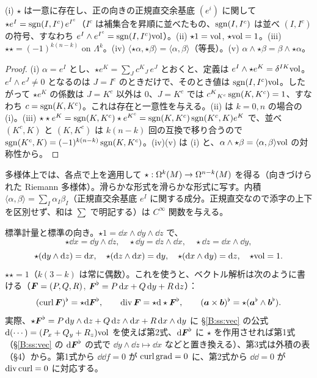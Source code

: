 \begin{prop}\label{B:prop:star}\tP
(i) $\star$ は一意に存在し、正の向きの正規直交余基底 $(e^i)$ に関して $\star e^I=\operatorname{sgn}(I,I^c)\,e^{I^c}$（$I^c$ は補集合を昇順に並べたもの、$\operatorname{sgn}(I,I^c)$ は並べ $(I,I^c)$ の符号、すなわち $e^I\wedge e^{I^c}=\operatorname{sgn}(I,I^c)\mathrm{vol}$）。(ii) $\star1=\mathrm{vol}$, $\star\mathrm{vol}=1$。(iii) $\star\star=(-1)^{k(n-k)}$ on $\Lambda^k$。(iv) $\langle\star\alpha,\star\beta\rangle=\langle\alpha,\beta\rangle$（等長）。(v) $\alpha\wedge\star\beta=\beta\wedge\star\alpha$。
\end{prop}
\begin{proof}
(i) $\alpha=e^I$ とし、$\star e^K=\sum_Jc^K{}_J\,e^J$ とおくと、定義は $e^I\wedge\star e^K=\delta^{IK}\mathrm{vol}$。$e^I\wedge e^J\ne0$ となるのは $J=I^c$ のときだけで、そのとき値は $\operatorname{sgn}(I,I^c)\mathrm{vol}$。したがって $\star e^K$ の係数は $J=K^c$ 以外は $0$、$J=K^c$ では $c^K{}_{K^c}\operatorname{sgn}(K,K^c)=1$、すなわち $c=\operatorname{sgn}(K,K^c)$。これは存在と一意性を与える。(ii) は $k=0,n$ の場合の (i)。(iii) $\star\star e^K=\operatorname{sgn}(K,K^c)\star e^{K^c}=\operatorname{sgn}(K,K^c)\operatorname{sgn}(K^c,K)e^K$ で、並べ $(K^c,K)$ と $(K,K^c)$ は $k(n-k)$ 回の互換で移り合うので $\operatorname{sgn}(K^c,K)=(-1)^{k(n-k)}\operatorname{sgn}(K,K^c)$。(iv)(v) は (i) と、$\alpha\wedge\star\beta=\langle\alpha,\beta\rangle\mathrm{vol}$ の対称性から。
\end{proof}
多様体上では、各点で上を適用して $\star:\Omega^k(M)\to\Omega^{n-k}(M)$ を得る（向きづけられた \mbox{Riemann} 多様体）。滑らかな形式を滑らかな形式に写す。内積 $\langle\alpha,\beta\rangle=\sum_I\alpha_I\beta_I$（正規直交余基底 $e^I$ に関する成分。正規直交なので添字の上下を区別せず、和は $\sum$ で明記する）は $C^\infty$ 関数を与える。

\begin{ex}[$\R^3$ の Hodge 星]\label{B:ex:star3}
標準計量と標準の向き。$\star1=\dd x\wedge\dd y\wedge\dd z$ で、
\[
\star\dd x=\dd y\wedge\dd z,\quad\star\dd y=\dd z\wedge\dd x,\quad\star\dd z=\dd x\wedge\dd y,
\]
\[
\star(\mathrm{d} y\wedge\mathrm{d} z)=\mathrm{d} x,\quad\star(\mathrm{d} z\wedge\mathrm{d} x)=\mathrm{d} y,\quad\star(\mathrm{d} x\wedge\mathrm{d} y)=\mathrm{d} z,\quad\star\mathrm{vol}=1 .
\]
$\star\star=1$（$k(3-k)$ は常に偶数）。これを使うと、ベクトル解析は次のように書ける（$\boldsymbol F=(P,Q,R)$, $\boldsymbol F^\flat=P\,\mathrm{d} x+Q\,\mathrm{d} y+R\,\mathrm{d} z$）：
\[
(\operatorname{curl}\boldsymbol F)^\flat=\star\mathrm{d}\boldsymbol F^\flat,\qquad\operatorname{div}\boldsymbol F=\star\mathrm{d}\star\boldsymbol F^\flat,\qquad(\boldsymbol a\times\boldsymbol b)^\flat=\star(\boldsymbol a^\flat\wedge\boldsymbol b^\flat).
\]
実際、$\star\boldsymbol F^\flat=P\,\mathrm{d} y\wedge\mathrm{d} z+Q\,\mathrm{d} z\wedge\mathrm{d} x+R\,\mathrm{d} x\wedge\mathrm{d} y$ に \S\ref{B:ss:vec} の公式 $\mathrm{d}(\cdots)=(P_x+Q_y+R_z)\mathrm{vol}$ を使えば第2式、$\mathrm{d}\boldsymbol F^\flat$ に $\star$ を作用させれば第1式（\S\ref{B:ss:vec} の $\mathrm{d}\boldsymbol F^\flat$ の式で $\dd y\wedge\dd z\mapsto\dd x$ などと置き換える）、第3式は外積の表（§4）から。第1式から $\dd\dd f=0$ が $\operatorname{curl}\operatorname{grad}=0$ に、第2式から $\dd\dd=0$ が $\operatorname{div}\operatorname{curl}=0$ に対応する。
\end{ex}

